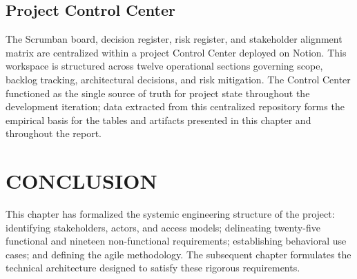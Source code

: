 \subsection{Project Control Center}
The Scrumban board, decision register, risk register, and stakeholder alignment matrix are centralized within a project Control Center deployed on Notion. This workspace is structured across twelve operational sections governing scope, backlog tracking, architectural decisions, and risk mitigation. The Control Center functioned as the single source of truth for project state throughout the development iteration; data extracted from this centralized repository forms the empirical basis for the tables and artifacts presented in this chapter and throughout the report.

\section*{CONCLUSION}
This chapter has formalized the systemic engineering structure of the project: identifying stakeholders, actors, and access models; delineating twenty-five functional and nineteen non-functional requirements; establishing behavioral use cases; and defining the agile methodology. The subsequent chapter formulates the technical architecture designed to satisfy these rigorous requirements.

